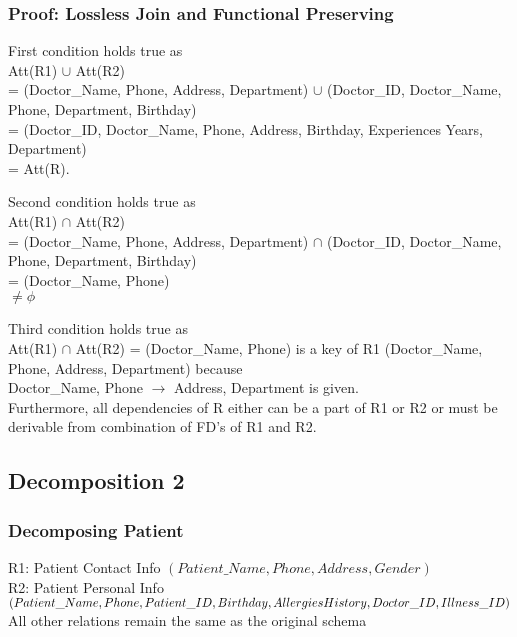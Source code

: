 \documentclass[12pt,arial]{article}
\begin{document}
\subsubsection{Proof: Lossless Join and Functional Preserving}
 First condition holds true as \\Att(R1) $\cup$ Att(R2) \\= (Doctor\_Name, Phone, Address, Department) $\cup$ (Doctor\_ID, Doctor\_Name, Phone, Department, Birthday) \\= (Doctor\_ID, Doctor\_Name, Phone, Address, Birthday, Experiences Years, Department) \\= Att(R).\\ \hfil \break

Second condition holds true as \\Att(R1) $\cap$  Att(R2) \\= (Doctor\_Name, Phone, Address, Department) $\cap$ (Doctor\_ID, Doctor\_Name, Phone, Department, Birthday) \\= (Doctor\_Name, Phone) \\$\neq \phi$\\ \hfil \break

Third condition holds true as \\Att(R1) $\cap$ Att(R2) = (Doctor\_Name, Phone) is a key of R1 (Doctor\_Name, Phone, Address, Department) because \\Doctor\_Name, Phone $\rightarrow$ Address, Department is given.\\ \hfil \break
Furthermore, all dependencies of R either can be a part of R1 or R2 or must be derivable from combination of FD’s of R1 and R2.\\ \hfil \break
\subsection{Decomposition 2}
\subsubsection{Decomposing Patient}
R1: Patient Contact Info $(Patient\_Name, Phone, Address,Gender)$\\
R2: Patient Personal Info $(Patient\_Name, Phone, Patient\_ID, \\Birthday, Allergies History, Doctor\_ID, Illness\_ID)$\\ \hfil \break
All other relations remain the same as the original schema
\end{document}
